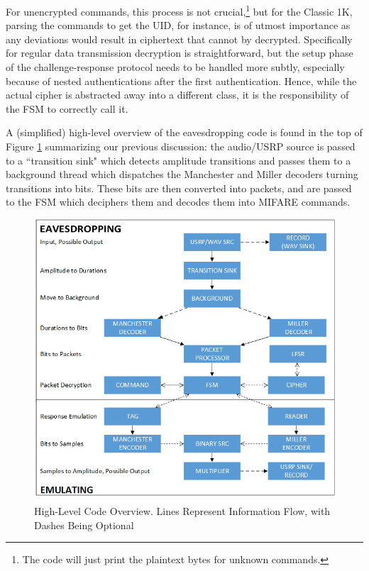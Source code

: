\documentclass[fleqn,10pt]{SelfArx} %
\begin{document}
For unencrypted commands, this process is not crucial,\footnote{The code will just print the plaintext bytes for unknown commands.} but for the Classic 1K, parsing the commands to get the UID, for instance, is of utmost importance as any deviations would result in ciphertext that cannot by decrypted. Specifically for regular data transmission decryption is straightforward, but the setup phase of the challenge-response protocol needs to be handled more subtly, especially because of nested authentications after the first authentication. Hence, while the actual cipher is abstracted away into a different class, it is the responsibility of the FSM to correctly call it.

A (simplified) high-level overview of the eavesdropping code is found in the top of Figure \ref{fig:code} summarizing our previous discussion: the audio/USRP source is passed to a ``transition sink" which detects amplitude transitions and passes them to a background thread which dispatches the Manchester and Miller decoders turning transitions into bits. These bits are then converted into packets, and are passed to the FSM which deciphers them and decodes them into MIFARE commands.


\begin{figure}[tp]
  \includegraphics[width=\linewidth]{img/code}
  \caption{High-Level Code Overview. Lines Represent Information Flow, with Dashes Being Optional}
  \label{fig:code}
\end{figure}
\end{document}
